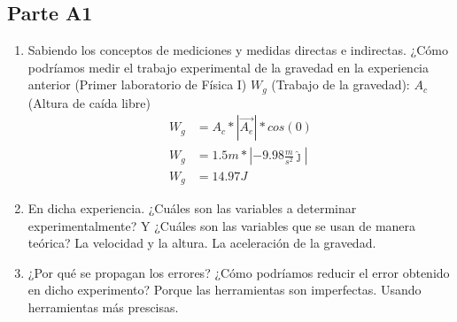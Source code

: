 \subsection{Parte A1}%
\label{sub:cues_parte_a1}

\begin{enumerate}
	\item Sabiendo los conceptos de mediciones y medidas directas e indirectas.
		¿Cómo podríamos medir el trabajo experimental de la gravedad en la experiencia anterior
		(Primer laboratorio de Física I)\newline
		$W_g$ (Trabajo de la gravedad):\newline
		$A_c$ (Altura de caída libre)
		\begin{align*}
			W_g &= A_c * |\vec{A_e}| * cos(0)\\
			W_g &= 1.5m*|-9.98 \frac{m}{s^2} \widehat{\jmath}| \\
			W_g &= 14.97 J
		\end{align*}
	\item En dicha experiencia. ¿Cuáles son las variables a determinar experimentalmente?
		Y ¿Cuáles son las variables que se usan de manera teórica?
		\subitem La velocidad y la altura.
		\subitem La aceleración de la gravedad.
	\item ¿Por qué se propagan los errores?
		¿Cómo podríamos reducir el error obtenido en dicho experimento?
		\subitem Porque las herramientas son imperfectas.
		\subitem Usando herramientas más prescisas.
\end{enumerate}

